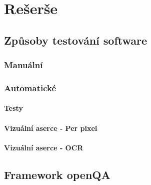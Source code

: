 \chapter{Rešerše}
\label{kap:Reserse}


\section{Způsoby testování software}
\label{sek:zpus_test_soft}

\subsection{Manuální}
\label{subsek:test_manual}

\subsection{Automatické}
\label{suksek:test_aut}

\subsubsection{Testy}
\label{subsubsek:testy}

\subsubsection{Vizuální aserce - Per pixel}
\label{subsubsek:viz_aserce_per_pixel}

\subsubsection{Vizuální aserce - OCR}
\label{subsubsek:viz_aserce_ocr}

\section{Framework openQA}
\label{sek:openQA}

